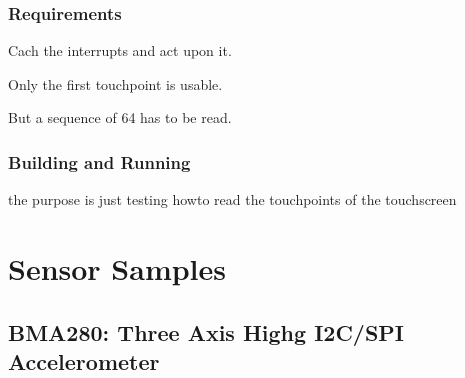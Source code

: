 \documentclass[letterpaper,10pt,english]{sphinxmanual}
\begin{document}
\subsubsection{Requirements}
\label{\detokenize{samples/basic/touchpoints/README:requirements}}
Cach the interrupts and act upon it.

Only the first touchpoint is usable.

But a sequence of 64 has to be read.


\subsubsection{Building and Running}
\label{\detokenize{samples/basic/touchpoints/README:building-and-running}}
the purpose is just testing howto read the touchpoints of the touchscreen


\section{Sensor Samples}
\label{\detokenize{samples/sensor/sensor:sensor-samples}}\label{\detokenize{samples/sensor/sensor:id1}}\label{\detokenize{samples/sensor/sensor::doc}}

\subsection{BMA280: Three Axis High\sphinxhyphen{}g I2C/SPI Accelerometer}
\label{\detokenize{samples/sensor/bma280/README:bma280-three-axis-high-g-i2c-spi-accelerometer}}\label{\detokenize{samples/sensor/bma280/README:bma280}}\label{\detokenize{samples/sensor/bma280/README::doc}}
\end{document}
